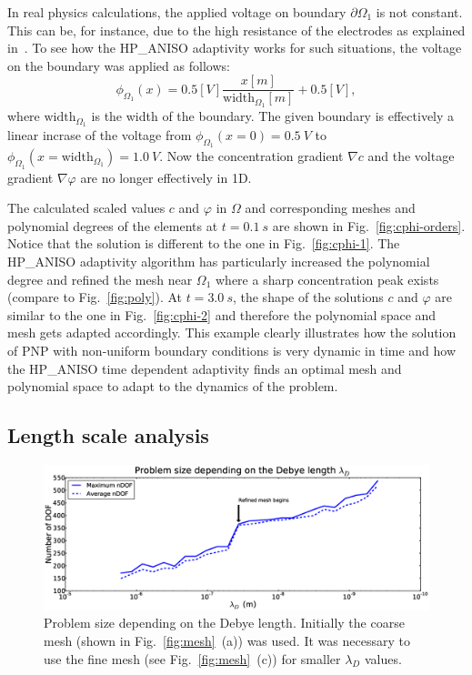 In real physics calculations, the applied voltage on boundary $\partial\Omega_1$
is not constant. This can be, for instance, due to the high resistance of
the electrodes as explained in~\cite{pugal2009}.
To see how the HP\_ANISO adaptivity works for such situations, the
voltage on the boundary was applied as follows:
\begin{equation}
  \phi_{\Omega_1}\left( x \right)=0.5\left[V \right] \frac{x\left[ m \right ]}{\text{width}_{\Omega_1}\left[ m \right]}+0.5\left[ V \right],
\end{equation}
where $\text{width}_{\Omega_1}$ is the width of the boundary. The given boundary is effectively
a linear incrase of the voltage from $\phi_{\Omega_1}\left(x = 0 \right)=0.5\ V$ to
$\phi_{\Omega_1}\left(x=\text{width}_{\Omega_1}\right) = 1.0\ V$.
Now the concentration gradient $\nabla c$ and the voltage gradient $\nabla \varphi$ are no
longer effectively in 1D.

The calculated scaled values $c$ and $\varphi$ in $\Omega$ and corresponding meshes and polynomial
degrees of the elements at $t=0.1\ s$ are shown in Fig.~\ref{fig:cphi-orders}.
Notice that the solution
is different to the one in Fig.~\ref{fig:cphi-1}. The HP\_ANISO
adaptivity algorithm has particularly increased the polynomial degree
and refined the mesh near $\Omega_1$ where a sharp concentration
peak exists (compare to Fig.~\ref{fig:poly}).
At $t=3.0\ s$, the shape of the solutions $c$ and $\varphi$ are similar to the one
in Fig.~\ref{fig:cphi-2} and therefore the polynomial space and mesh gets adapted
accordingly. This example clearly illustrates how 
the solution of PNP with non-uniform
boundary conditions is very dynamic in time
and how the HP\_ANISO time dependent adaptivity 
finds an optimal mesh and polynomial space to adapt to the dynamics
of the problem. 

\subsection{Length scale analysis}

\begin{figure}[!ht]
  \begin{centering}
  \includegraphics[width=\columnwidth]{debye_dof}
  \caption{\label{fig:debye_dof} Problem size depending on the
	Debye length. Initially the coarse mesh (shown in Fig.~\ref{fig:mesh}~(a))
	was used. It was necessary to use the fine mesh (see Fig.~\ref{fig:mesh}~(c)) 
	for smaller $\lambda_D$ values.}
  \end{centering}
\end{figure}

